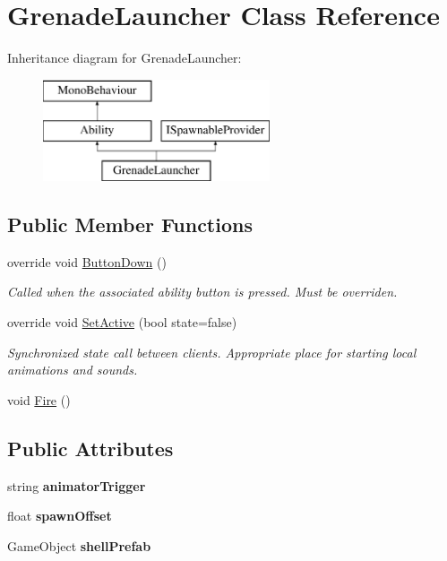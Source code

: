 \hypertarget{class_grenade_launcher}{}\section{Grenade\+Launcher Class Reference}
\label{class_grenade_launcher}
Inheritance diagram for Grenade\+Launcher\+:\begin{figure}[H]
\begin{center}
\leavevmode
\includegraphics[height=3.000000cm]{class_grenade_launcher}
\end{center}
\end{figure}
\subsection*{Public Member Functions}
\begin{DoxyCompactItemize}
\item 
override void \hyperlink{class_grenade_launcher_aad701030a96f84c21b002276247b5b9b}{Button\+Down} ()
\begin{DoxyCompactList}\small\item\em Called when the associated ability button is pressed. Must be overriden. \end{DoxyCompactList}\item 
override void \hyperlink{class_grenade_launcher_a4886ca94e7f3d8e3b0ddf23b0d8aaffe}{Set\+Active} (bool state=false)
\begin{DoxyCompactList}\small\item\em Synchronized state call between clients. Appropriate place for starting local animations and sounds. \end{DoxyCompactList}\item 
void \hyperlink{class_grenade_launcher_a15da3bc60ea91ec299c87f8f28e5d30a}{Fire} ()
\end{DoxyCompactItemize}
\subsection*{Public Attributes}
\begin{DoxyCompactItemize}
\item 
\hypertarget{class_grenade_launcher_a6feb790698d53db49f151f636c69e260}{}\label{class_grenade_launcher_a6feb790698d53db49f151f636c69e260} 
string {\bfseries animator\+Trigger}
\item 
\hypertarget{class_grenade_launcher_a27e1054395ffb62595e45a24c41d823b}{}\label{class_grenade_launcher_a27e1054395ffb62595e45a24c41d823b} 
float {\bfseries spawn\+Offset}
\item 
\hypertarget{class_grenade_launcher_a47a9afcd5d9cf4a9469227d6ab476d93}{}\label{class_grenade_launcher_a47a9afcd5d9cf4a9469227d6ab476d93} 
Game\+Object {\bfseries shell\+Prefab}
\end{DoxyCompactItemize}

